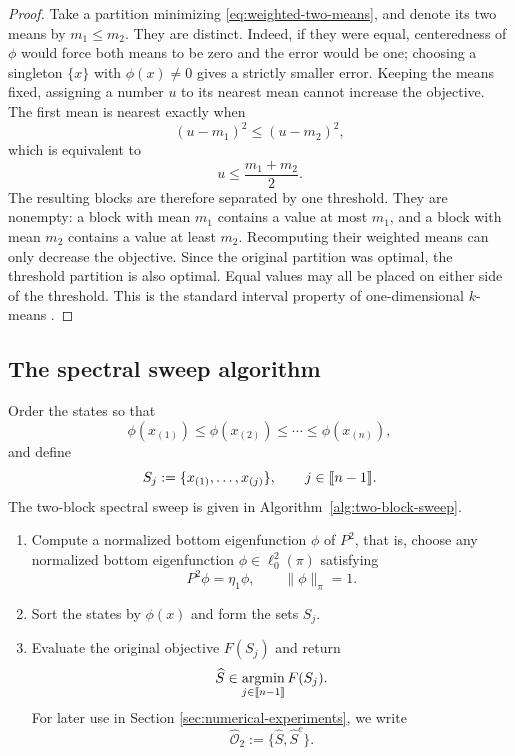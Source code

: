 \documentclass[11pt]{article}
\newcommand{\1}{\mathbf{1}}
\providecommand{\llbracket}{\mathopen{[\mkern-2.7mu[}}
\providecommand{\rrbracket}{\mathclose{]\mkern-2.7mu]}}
\begin{document}
\begin{proof}
Take a partition minimizing \eqref{eq:weighted-two-means}, and denote
its two means by $m_1\leq m_2$.  They are distinct.  Indeed, if they
were equal, centeredness of $\phi$ would force both means to be zero
and the error would be one; choosing a singleton $\{x\}$ with
$\phi(x)\neq0$ gives a strictly smaller error.  Keeping the means fixed, assigning a
number $u$ to its nearest mean cannot increase the objective.  The
first mean is nearest exactly when
\[
    (u-m_1)^2\leq(u-m_2)^2,
\]
which is equivalent to
\[
    u\leq\frac{m_1+m_2}{2}.
\]
The resulting blocks are therefore separated by one threshold.
They are nonempty: a block with mean $m_1$ contains a value at most
$m_1$, and a block with mean $m_2$ contains a value at least $m_2$.
Recomputing their weighted means can only decrease the objective.
Since the original partition was optimal, the threshold partition is
also optimal.  Equal values may all be placed on either side of the
threshold.  This is the standard interval property of one-dimensional
$k$-means \citep{NielsenNock2014,SongZhong2020}.
\end{proof}

\subsection{The spectral sweep algorithm}

Order the states so that
\[
    \phi(x_{(1)})\leq\phi(x_{(2)})\leq\cdots
    \leq\phi(x_{(n)}),
\]
and define
\[
    S_j:=\{x_{(1)},\ldots,x_{(j)}\},
    \qquad j\in\llbracket n-1\rrbracket.
\]
The two-block spectral sweep is given in
Algorithm~\ref{alg:two-block-sweep}.

\begin{algorithm}[H]
\caption{Two-block spectral sweep}
\label{alg:two-block-sweep}
\begin{enumerate}
    \item Compute a normalized bottom eigenfunction $\phi$ of $P^2$, that is, choose any normalized bottom eigenfunction
    $\phi\in\ell^2_0(\pi)$ satisfying
    \[
    P^2\phi=\eta_1\phi,
    \qquad
    \|\phi\|_\pi=1.
    \]
    \item Sort the states by $\phi(x)$ and form the sets $S_j$.
    \item Evaluate the original objective $F(S_j)$ and return
    \[
        \widehat S\in
        \operatorname*{argmin}_{j\in\llbracket n-1\rrbracket}F(S_j).
    \]
    For later use in Section \ref{sec:numerical-experiments}, we write
    \[
    \widehat{\mathcal O}_2
    :=\{\widehat S,\widehat S^c\}.
    \]
\end{enumerate}
\end{algorithm}
\end{document}
